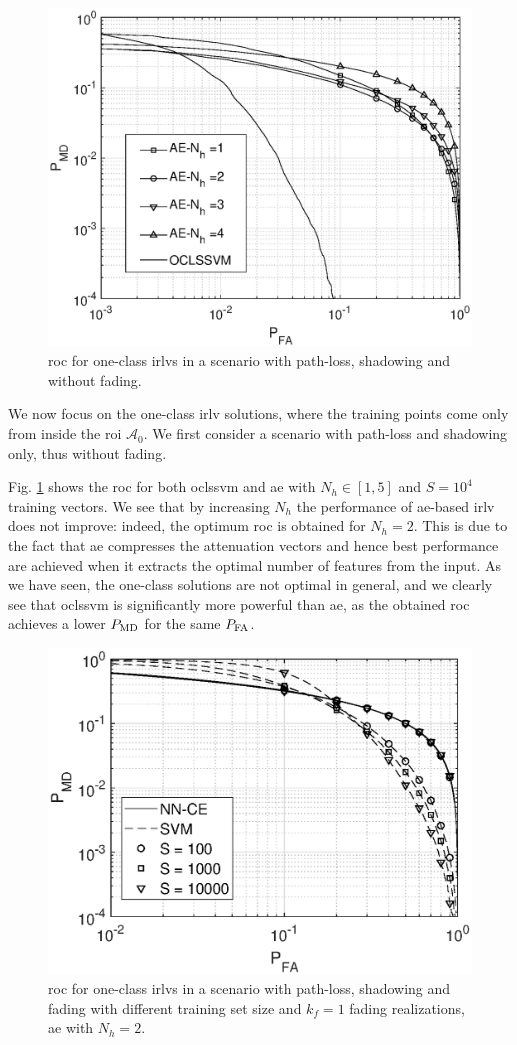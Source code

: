 \documentclass[draftcls,onecolumn,12pt]{IEEEtran}
\begin{document}
\begin{figure}[t]
    \centering
    \includegraphics[width=0.6\columnwidth]{res_ae_onNeur.eps}
    \caption{\ac{roc} for one-class \acp{irlv} in a scenario with path-loss, shadowing and without fading.}
    \label{fig:aeNh}
\end{figure}

We now focus on the one-class \ac{irlv} solutions, where the training points come only from inside the \ac{roi} $\mathcal A_0$.  We first consider a scenario with path-loss and shadowing only, thus without fading.

Fig. \ref{fig:aeNh} shows the \ac{roc} for both \ac{oclssvm} and \ac{ae} with $N_h \in [1, 5]$ and $S=10^4$ training vectors. We see that by increasing $N_h$ the performance of \ac{ae}-based \ac{irlv} does not improve: indeed, the optimum \ac{roc} is obtained for $N_h=2$. This is due to the fact that  \ac{ae} compresses the attenuation vectors and hence best performance are achieved when it  extracts the optimal number of features from the input. As we have seen, the one-class solutions are not optimal in general, and we clearly see that \ac{oclssvm} is significantly more powerful than \ac{ae}, as the obtained \ac{roc} achieves a lower $P_{\rm MD}$ for the same $P_{\rm FA}$.
 
 
\begin{figure}[t]
    \centering
    \includegraphics[width=0.6\columnwidth]{res_avgnTrain_oneClass_kf1.eps}
    \caption{\ac{roc} for one-class \acp{irlv} in a scenario with path-loss, shadowing and fading with different training set size and $k_f=1$ fading realizations,  \ac{ae} with $N_h = 2$. }
    \label{fig:kf1Oc}
\end{figure}
\end{document}
